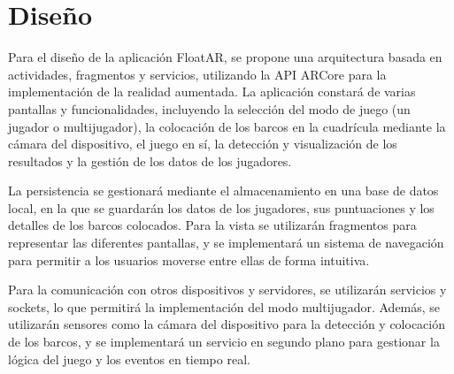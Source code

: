 \documentclass[a4paper,openright,12pt]{article}
\begin{document}
\section{Diseño}
Para el diseño de la aplicación FloatAR, se propone una arquitectura basada en actividades, fragmentos y servicios, utilizando la API ARCore para la implementación de la realidad aumentada. La aplicación constará de varias pantallas y funcionalidades, incluyendo la selección del modo de juego (un jugador o multijugador), la colocación de los barcos en la cuadrícula mediante la cámara del dispositivo, el juego en sí, la detección y visualización de los resultados y la gestión de los datos de los jugadores.

La persistencia se gestionará mediante el almacenamiento en una base de datos local, en la que se guardarán los datos de los jugadores, sus puntuaciones y los detalles de los barcos colocados. Para la vista se utilizarán fragmentos para representar las diferentes pantallas, y se implementará un sistema de navegación para permitir a los usuarios moverse entre ellas de forma intuitiva.

Para la comunicación con otros dispositivos y servidores, se utilizarán servicios y sockets, lo que permitirá la implementación del modo multijugador. Además, se utilizarán sensores como la cámara del dispositivo para la detección y colocación de los barcos, y se implementará un servicio en segundo plano para gestionar la lógica del juego y los eventos en tiempo real.



\end{document}
